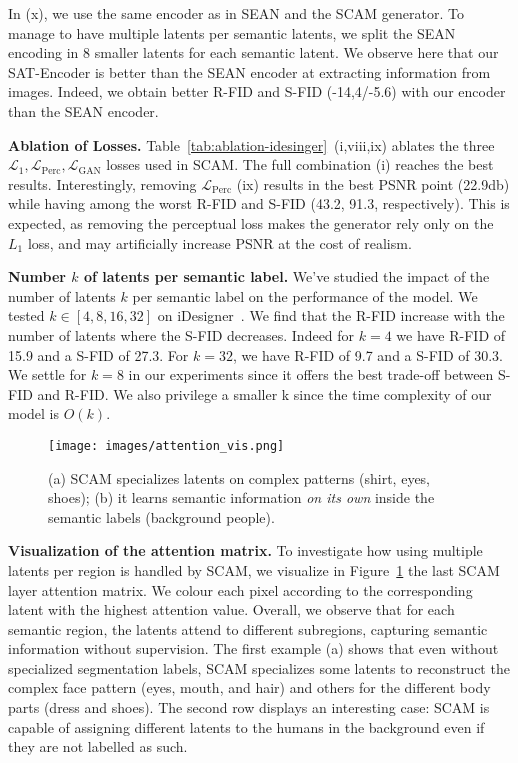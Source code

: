 \documentclass[runningheads]{llncs}
\makeatletter
\newcommand{\mname}{SCAM\@\xspace}
\makeatother
\begin{document}
In (x), we use the same encoder as in SEAN and the SCAM generator. To manage to have multiple latents per semantic latents, we split the SEAN encoding in 8 smaller latents for each semantic latent. We observe here that our SAT-Encoder is better than the SEAN encoder at extracting information from images. Indeed, we obtain better R-FID and S-FID (-14,4/-5.6) with our encoder than the SEAN encoder.

\noindent \textbf{Ablation of Losses.} 
Table~\ref{tab:ablation-idesinger}~(i,viii,ix) ablates the three $\mathcal{L}_1,\mathcal{L}_{\text{Perc}},\mathcal{L}_{\text{GAN}}$ losses used in \mname.  
The full combination (i) reaches the best results. 
Interestingly, removing $\mathcal{L}_{\text{Perc}}$ (ix) results in the best PSNR point (22.9db) while having among the worst R-FID and S-FID (43.2, 91.3, respectively). 
This is expected, as removing the perceptual loss makes the generator rely only on the $L_1$ loss, and may artificially increase PSNR at the cost of realism.

\noindent \textbf{Number $k$ of latents per semantic label.} 
We've studied the impact of the number of latents $k$ per semantic label on the performance of the model. We tested $k\in[4,8,16,32]$ on iDesigner~\cite{idesigner}. We find that the R-FID increase with the number of latents where the S-FID decreases. Indeed for $k=4$ we have R-FID of 15.9 and a S-FID of 27.3. For $k=32$, we have  R-FID of 9.7 and a S-FID of 30.3. We settle for $k=8$ in our experiments since it offers the best trade-off between S-FID and R-FID. We also privilege a smaller k since the time complexity of our model is $O(k)$.





\begin{figure}[b]
\caption{\small{(a) \mname specializes latents on complex patterns (shirt, eyes, shoes); (b) it learns semantic information \emph{on its own} inside the semantic labels (background people).}}
\texttt{[image: images/attention\_vis.png]}
\label{fig:attention_vis}
\end{figure}
\noindent \textbf{Visualization of the attention matrix.} 
To investigate how using multiple latents per region is handled by \mname, we visualize in Figure~\ref{fig:attention_vis} the last \mname layer attention matrix. We colour each pixel according to the corresponding latent with the highest attention value.
Overall, we observe that for each semantic region, the latents attend to different subregions, capturing semantic information without supervision. 
The first example (a) shows that even without specialized segmentation labels, \mname specializes some latents to reconstruct the complex face pattern (eyes, mouth, and hair) and others for the different body parts (dress and shoes). 
The second row displays an interesting case: 
\mname is capable of assigning different latents to the humans in the background even if they are not labelled as such.
\end{document}
